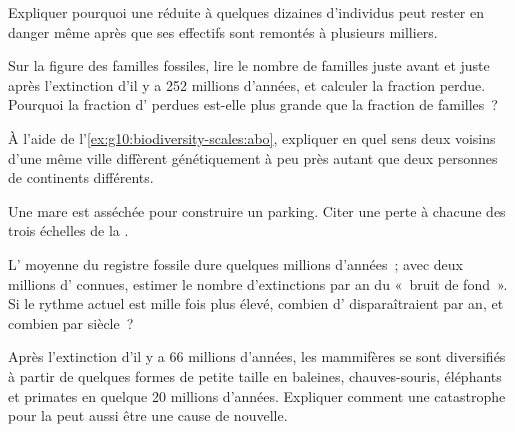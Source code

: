 \begin{exercise}[$\star\star$]\label{exo:g10:biodiversity-scales:8}
Expliquer pourquoi une  réduite à quelques dizaines d'individus
peut rester en danger même après que ses effectifs sont remontés à
plusieurs milliers.
\end{exercise}

\begin{exercise}[$\star\star$]\label{exo:g10:biodiversity-scales:9}
Sur la figure des familles fossiles, lire le nombre de familles juste
avant et juste après l'extinction d'il y a 252 millions d'années, et
calculer la fraction perdue. Pourquoi la fraction d'\emph{}
perdues est-elle plus grande que la fraction de familles~?
\end{exercise}

\begin{exercise}[$\star\star$]\label{exo:g10:biodiversity-scales:10}
À l'aide de l'\cref{ex:g10:biodiversity-scales:abo}, expliquer en quel
sens deux voisins d'une même ville diffèrent génétiquement à peu près
autant que deux personnes de continents différents.
\end{exercise}

\begin{exercise}[$\star\star$]\label{exo:g10:biodiversity-scales:11}
Une mare est asséchée pour construire un parking. Citer une perte à
chacune des trois échelles de la .
\end{exercise}

\begin{exercise}[$\star\star\star$]\label{exo:g10:biodiversity-scales:12}
L' moyenne du registre fossile dure quelques millions d'années~;
avec deux millions d' connues, estimer le nombre
d'extinctions par an du «~bruit de fond~». Si le rythme actuel est
mille fois plus élevé, combien d' disparaîtraient par an, et
combien par siècle~?
\end{exercise}

\begin{exercise}[$\star\star\star$]\label{exo:g10:biodiversity-scales:13}
Après l'extinction d'il y a 66 millions d'années, les mammifères se
sont diversifiés à partir de quelques formes de petite taille en
baleines, chauves-souris, éléphants et primates en quelque 20 millions
d'années. Expliquer comment une catastrophe pour la  peut
aussi être une cause de  nouvelle.
\end{exercise}

